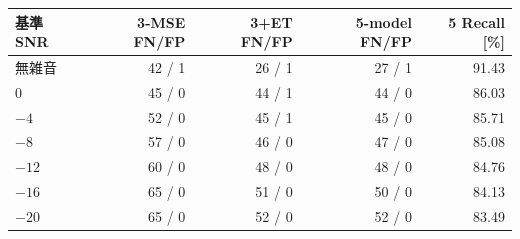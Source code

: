 \begin{tabular}{lrrrr}
\toprule
基準SNR & 3-MSE FN/FP & 3+ET FN/FP & 5-model FN/FP & 5 Recall [\%] \\
\midrule
無雑音 & 42 / 1 & 26 / 1 & 27 / 1 & 91.43 \\
$0$ & 45 / 0 & 44 / 1 & 44 / 0 & 86.03 \\
$-4$ & 52 / 0 & 45 / 1 & 45 / 0 & 85.71 \\
$-8$ & 57 / 0 & 46 / 0 & 47 / 0 & 85.08 \\
$-12$ & 60 / 0 & 48 / 0 & 48 / 0 & 84.76 \\
$-16$ & 65 / 0 & 51 / 0 & 50 / 0 & 84.13 \\
$-20$ & 65 / 0 & 52 / 0 & 52 / 0 & 83.49 \\
\bottomrule
\end{tabular}
